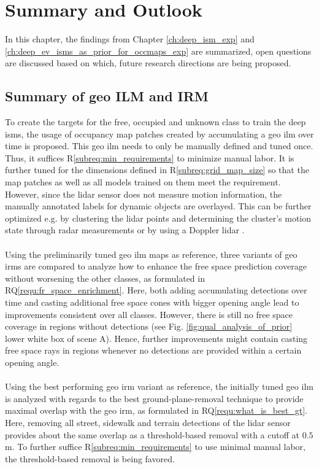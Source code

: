 \chapter{Summary and Outlook}
\label{ch:discussion_of_req_n_rq}
In this chapter, the findings from Chapter \ref{ch:deep_ism_exp} and \ref{ch:deep_ev_isms_as_prior_for_occmaps_exp} are summarized, open questions are discussed based on which, future research directions are being proposed.
%
\section{Summary of geo ILM and IRM}
\label{sec:disc_of_geo_ilm_n_irm}
To create the targets for the free, occupied and unknown class to train the deep \gls{ism}s, the usage of occupancy map patches created by accumulating a geo \gls{ilm} over time is proposed. This geo \gls{ilm} needs to only be manually defined and tuned once. Thus, it suffices R\ref{subreq:min_requirements} to minimize manual labor. It is further tuned for the dimensions defined in R\ref{subreq:grid_map_size} so that the map patches as well as all models trained on them meet the requirement. However, since the lidar sensor does not measure motion information, the manually annotated labels for dynamic objects are overlayed. This can be further optimized e.g. by clustering the lidar points and determining the cluster's motion state through radar measurements or by using a Doppler lidar \cite{ma2019moving}.
\\\\
Using the preliminarily tuned geo \gls{ilm} maps as reference, three variants of geo \gls{irm}s are compared to analyze how to enhance the free space prediction coverage without worsening the other classes, as formulated in RQ\ref{requ:fr_space_enrichment}. Here, both adding accumulating detections over time and casting additional free space cones with bigger opening angle lead to improvements consistent over all classes. However, there is still no free space coverage in regions without detections (see Fig. \ref{fig:qual_analysis_of_prior} lower white box of scene A). Hence, further improvements might contain casting free space rays in regions whenever no detections are provided within a certain opening angle.
\\\\
Using the best performing geo \gls{irm} variant as reference, the initially tuned geo \gls{ilm} is analyzed with regards to the best ground-plane-removal technique to provide maximal overlap with the geo \gls{irm}, as formulated in RQ\ref{requ:what_is_best_gt}. Here, removing all street, sidewalk and terrain detections of the lidar sensor provides about the same overlap as a threshold-based removal with a cutoff at $0.5$ m. To further suffice R\ref{subreq:min_requirements} to use minimal manual labor, the threshold-based removal is being favored.
%
